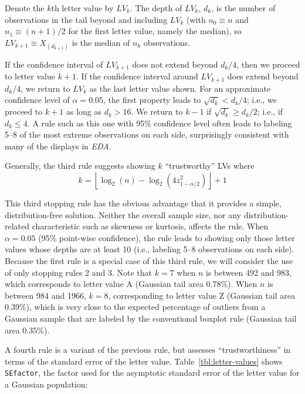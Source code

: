\documentclass[oneside]{article}
\begin{document}
Denote the $k$th letter value by $LV_k$. The depth of $LV_k$, $d_k$, is the number of observations in the tail beyond and including $LV_{k}$ (with $n_0 \equiv n$ and $n_1 \equiv (n+1)/2$ for the first letter value, namely the median), so $LV_{k+1} \equiv X_{(d_{k+1})}$ is the median of $n_k$ observations.

If the confidence interval of $LV_{k+1}$ does not extend beyond $d_k/4$, then we proceed to letter value $k+1$. If the confidence interval around $LV_{k+1}$ does extend beyond $d_k/4$, we return to $LV_{k}$ as the last letter value shown. For an approximate confidence level of $\alpha= 0.05$, the first property leads to $\sqrt{d_k} < d_k/4$; i.e., we proceed to $k+1$ as long as $d_k > 16$. We return to $k-1$ if $\sqrt{d_k} \ge d_k/2$; i.e., if $d_k \le 4$. A rule such as this one with 95\% confidence level often leads to labeling 5--8 of the most extreme observations on each side, surprisingly consistent with many of the displays in \textit{EDA}.

Generally, the third rule suggests showing $k$  ``trustworthy'' LVs where
\begin{equation}
k =  \left \lfloor 
        \log_2(n) - \log_2 \left(4 z_{1 - \alpha / 2} ^ 2 \right) 
     \right \rfloor + 1
\end{equation}

\noindent This third stopping rule has the obvious advantage that it provides a simple, distribution-free solution. Neither the overall sample size, nor any distribution-related characteristic such as skewness or kurtosis, affects the rule. When $\alpha = 0.05$ (95\% point-wise confidence), the rule leads to showing only those letter values whose depths are at least 10 (i.e., labeling 5--8 observations on each side). Because the first rule is a special case of this third rule, we will consider the use of only stopping rules 2 and 3. Note that $k = 7$ when $n$ is between 492 and 983, which corresponds to letter value A (Gaussian tail area 0.78\%). When $n$ is between 984 and 1966, $k = 8$, corresponding to letter value Z (Gaussian tail area 0.39\%), which is very close to the expected percentage of outliers from a Gaussian sample that are labeled by the conventional boxplot rule (Gaussian tail area 0.35\%).


A fourth rule is a variant of the previous rule, but assesses ``trustworthiness'' in terms of the standard error of the letter value. Table~\ref{tbl:letter-values} shows \texttt{SEfactor}, the factor used for the asymptotic standard error of the letter value for a Gaussian population:
\end{document}

